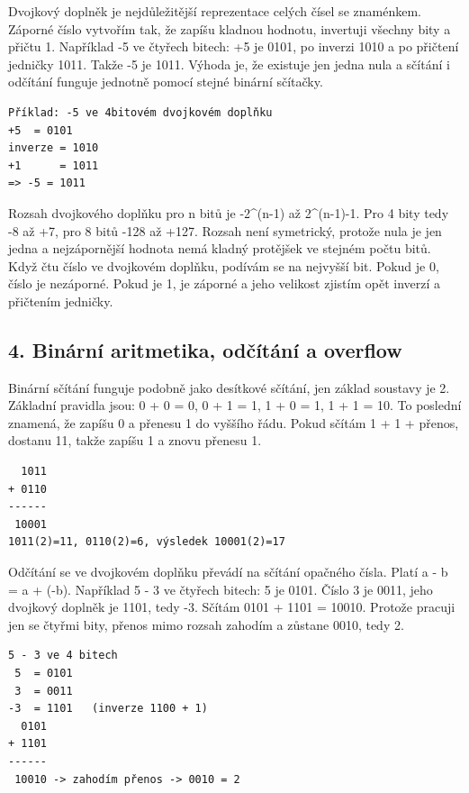 Dvojkový doplněk je nejdůležitější reprezentace celých čísel se znaménkem. Záporné číslo vytvořím tak, že zapíšu kladnou hodnotu, invertuji všechny bity a přičtu 1. Například -5 ve čtyřech bitech: +5 je 0101, po inverzi 1010 a po přičtení jedničky 1011. Takže -5 je 1011. Výhoda je, že existuje jen jedna nula a sčítání i odčítání funguje jednotně pomocí stejné binární sčítačky.

\begin{codebox}
\small
\begin{verbatim}
Příklad: -5 ve 4bitovém dvojkovém doplňku
+5  = 0101
inverze = 1010
+1      = 1011
=> -5 = 1011
\end{verbatim}
\end{codebox}

Rozsah dvojkového doplňku pro n bitů je -2\textasciicircum{}(n-1) až 2\textasciicircum{}(n-1)-1. Pro 4 bity tedy -8 až +7, pro 8 bitů -128 až +127. Rozsah není symetrický, protože nula je jen jedna a nejzápornější hodnota nemá kladný protějšek ve stejném počtu bitů. Když čtu číslo ve dvojkovém doplňku, podívám se na nejvyšší bit. Pokud je 0, číslo je nezáporné. Pokud je 1, je záporné a jeho velikost zjistím opět inverzí a přičtením jedničky.

\subsection*{4. Binární aritmetika, odčítání a overflow}

Binární sčítání funguje podobně jako desítkové sčítání, jen základ soustavy je 2. Základní pravidla jsou: 0 + 0 = 0, 0 + 1 = 1, 1 + 0 = 1, 1 + 1 = 10. To poslední znamená, že zapíšu 0 a přenesu 1 do vyššího řádu. Pokud sčítám 1 + 1 + přenos, dostanu 11, takže zapíšu 1 a znovu přenesu 1.

\begin{codebox}
\small
\begin{verbatim}
  1011
+ 0110
------
 10001
1011(2)=11, 0110(2)=6, výsledek 10001(2)=17
\end{verbatim}
\end{codebox}

Odčítání se ve dvojkovém doplňku převádí na sčítání opačného čísla. Platí a - b = a + (-b). Například 5 - 3 ve čtyřech bitech: 5 je 0101. Číslo 3 je 0011, jeho dvojkový doplněk je 1101, tedy -3. Sčítám 0101 + 1101 = 10010. Protože pracuji jen se čtyřmi bity, přenos mimo rozsah zahodím a zůstane 0010, tedy 2.

\begin{codebox}
\small
\begin{verbatim}
5 - 3 ve 4 bitech
 5  = 0101
 3  = 0011
-3  = 1101   (inverze 1100 + 1)
  0101
+ 1101
------
 10010 -> zahodím přenos -> 0010 = 2
\end{verbatim}
\end{codebox}

